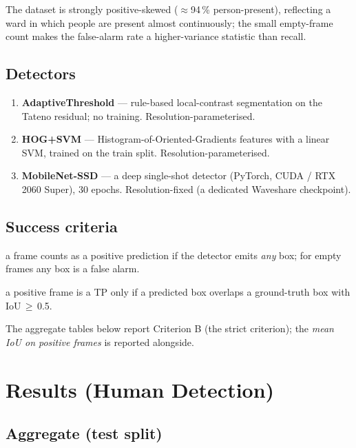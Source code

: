 \documentclass[11pt, a4paper]{article}
\begin{document}
The dataset is strongly positive-skewed ($\approx$94\,\% person-present),
reflecting a ward in which people are present almost continuously; the small
empty-frame count makes the false-alarm rate a higher-variance statistic than
recall.

\subsection{Detectors}
\begin{enumerate}[leftmargin=2em]
    \item \textbf{AdaptiveThreshold} — rule-based local-contrast segmentation on
          the Tateno residual; no training. Resolution-parameterised.
    \item \textbf{HOG+SVM} — Histogram-of-Oriented-Gradients features with a
          linear SVM, trained on the train split. Resolution-parameterised.
    \item \textbf{MobileNet-SSD} — a deep single-shot detector
          (PyTorch, CUDA / RTX 2060 Super), 30 epochs. Resolution-fixed
          (a dedicated Waveshare checkpoint).
\end{enumerate}

\subsection{Success criteria}
\begin{description}[leftmargin=2.5em, style=nextline]
    \item[Criterion A — Presence:] a frame counts as a positive prediction if the
        detector emits \emph{any} box; for empty frames any box is a false alarm.
    \item[Criterion B — Localisation (IoU\,$\ge$\,0.5):] a positive frame is a TP
        only if a predicted box overlaps a ground-truth box with IoU\,$\ge$\,0.5.
\end{description}
The aggregate tables below report Criterion B (the strict criterion); the
\emph{mean IoU on positive frames} is reported alongside.

\section{Results (Human Detection)}

\subsection{Aggregate (test split)}
\end{document}

